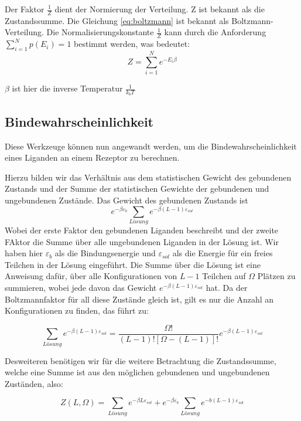 \documentclass[bachelor,       %
               twoside,        %
               BCOR10mm,       %
               english,ngerman, %
               ]{GAUBM}
\begin{document}
Der Faktor $\frac{1}{Z}$ dient der Normierung der Verteilung.
Z ist bekannt als die Zustandssumme. Die Gleichung \ref{eq:boltzmann}
ist bekannt als Boltzmann-Verteilung. Die Normalisierungskonstante $\frac{1}{Z}$
kann durch die Anforderung $ \sum_{i=1}^{N} p(E_i) = 1$ bestimmt werden, was bedeutet:
\begin{equation}
Z = \sum_{i=1}^{N}e^{-E_i\beta}
\end{equation}

$\beta$ ist hier die inverse Temperatur $\frac{1}{k_bT}$

\subsection{Bindewahrscheinlichkeit}
Diese Werkzeuge können nun angewandt werden, um die Bindewahrscheinlichkeit eines
Liganden an einem Rezeptor zu berechnen.

Hierzu bilden wir das Verhältnis aus dem statistischen Gewicht des gebundenen
Zustands und der Summe der statistischen Gewichte der gebundenen und ungebundenen
Zustände. Das Gewicht des gebundenen Zustands ist
$$e^{-\beta\varepsilon_b} \sum_{Lösung}e^{-\beta(L-1)\varepsilon_{sol}}$$
Wobei der erste Faktor den gebundenen Liganden beschreibt und der zweite FAktor die Summe
über alle ungebundenen Liganden in der Lösung ist. Wir haben hier $\varepsilon_b$ als
die Bindungsenergie und $\varepsilon_{sol}$ als die Energie für ein freies Teilchen
in der Lösung eingeführt. Die Summe über die Lösung ist eine Anweisung dafür,
über alle Konfigurationen von $L-1$ Teilchen auf $\Omega$ Plätzen zu summieren,
wobei jede davon das Gewicht $e^{-\beta(L-1)\varepsilon_{sol}}$ hat.
Da der Boltzmannfaktor für all diese Zustände gleich ist, gilt es nur
die Anzahl an Konfigurationen zu finden, das führt zu:

\begin{equation}
\label{gebundenerligand}
\sum_{Lösung}e^{-\beta(L-1)\varepsilon_{sol}} = \frac{\Omega!}{(L-1)![\Omega-(L-1)]!}e^{-\beta(L-1)\varepsilon_{sol}}
\end{equation}

Desweiteren benötigen wir für die weitere Betrachtung die Zustandssumme,
welche eine Summe ist aus den möglichen gebundenen und ungebundenen Zuständen, also:

\begin{equation}
Z(L,\Omega) = \sum_{Lösung}e^{-\beta L\varepsilon_{sol}} + e^{-\beta\varepsilon_b}\sum_{Lösung}e^{-b(L-1)\varepsilon_{sol}}
\end{equation}
\end{document}
